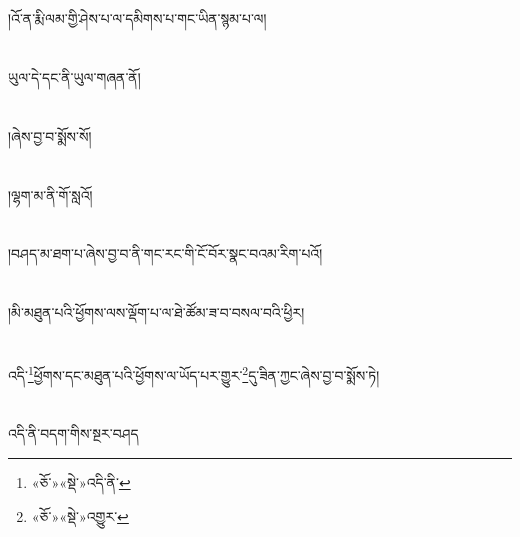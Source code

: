 \chapter{ }།འོ་ན་རྨི་ལམ་གྱི་ཤེས་པ་ལ་དམིགས་པ་གང་ཡིན་སྙམ་པ་ལ།\chapter{ }ཡུལ་དེ་དང་ནི་ཡུལ་གཞན་ནོ།\chapter{ }།ཞེས་བྱ་བ་སྨོས་སོ།\chapter{ }།ལྷག་མ་ནི་གོ་སླའོ།\chapter{ }།བཤད་མ་ཐག་པ་ཞེས་བྱ་བ་ནི་གང་རང་གི་ངོ་བོར་སྣང་བའམ་རིག་པའོ།\chapter{ }།མི་མཐུན་པའི་ཕྱོགས་ལས་ལྡོག་པ་ལ་ཐེ་ཚོམ་ཟ་བ་བསལ་བའི་ཕྱིར།\chapter{ }འདི་\footnote{«ཅོ་»«སྡེ་»འདི་ནི་}ཕྱོགས་དང་མཐུན་པའི་ཕྱོགས་ལ་ཡོད་པར་གྱུར་\footnote{«ཅོ་»«སྡེ་»འགྱུར་}དུ་ཟིན་ཀྱང་ཞེས་བྱ་བ་སྨོས་ཏེ།\chapter{ }འདི་ནི་བདག་གིས་སྔར་བཤད